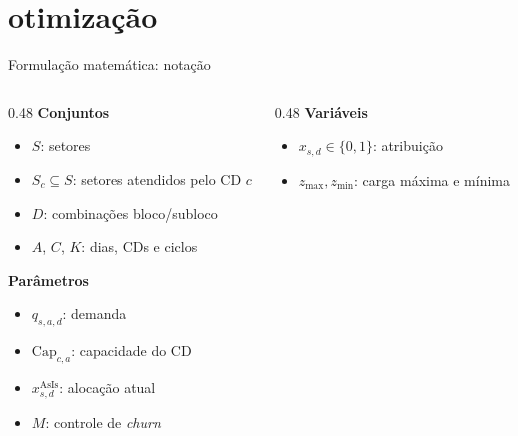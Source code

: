 \documentclass[aspectratio=169,11pt]{beamer}
\begin{document}
\section{otimização}

\begin{frame}{Formulação matemática: notação}
    \begin{columns}[T]
        \begin{column}{0.48\textwidth}
            \textbf{Conjuntos}
            \begin{itemize}
                \item $S$: setores
                \item $S_c \subseteq S$: setores atendidos pelo CD $c$
                \item $D$: combinações bloco/subloco
                \item $A$, $C$, $K$: dias, CDs e ciclos
            \end{itemize}
            \textbf{Parâmetros}
            \begin{itemize}
                \item $q_{s,a,d}$: demanda
                \item $\text{Cap}_{c,a}$: capacidade do CD
                \item $x^{\text{AsIs}}_{s,d}$: alocação atual
                \item $M$: controle de \textit{churn}
            \end{itemize}
        \end{column}
        \begin{column}{0.48\textwidth}
            \textbf{Variáveis}
            \begin{itemize}
                \item $x_{s,d}\in\{0,1\}$: atribuição
                \item $z_{\max}, z_{\min}$: carga máxima e mínima
            \end{itemize}
        \end{column}
    \end{columns}
\end{frame}
\end{document}
